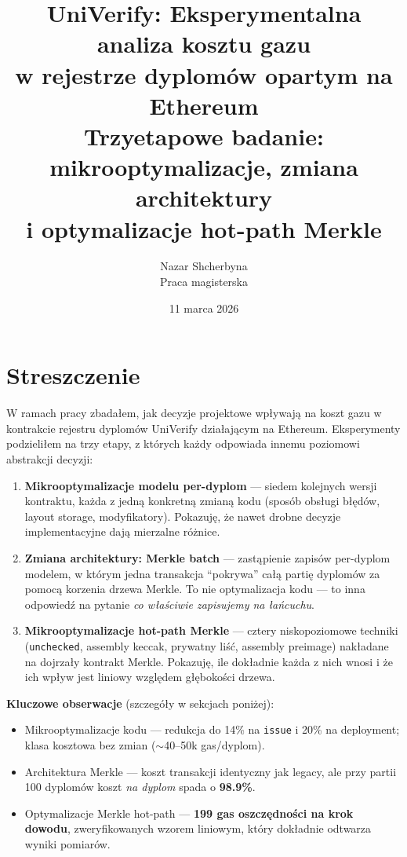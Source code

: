 \documentclass[11pt,a4paper]{article}
\title{\textbf{UniVerify: Eksperymentalna analiza kosztu gazu\\w rejestrze dyplomów opartym na Ethereum}\\[0.6em]
\large Trzyetapowe badanie: mikrooptymalizacje, zmiana architektury\\i optymalizacje hot-path Merkle}
\author{Nazar Shcherbyna \\ Praca magisterska}
\date{11 marca 2026}
\begin{document}
\maketitle
\tableofcontents
\newpage

\section{Streszczenie}

W ramach pracy zbadałem, jak decyzje projektowe wpływają na koszt gazu
w kontrakcie rejestru dyplomów UniVerify działającym na Ethereum.
Eksperymenty podzieliłem na trzy etapy, z których każdy odpowiada innemu
poziomowi abstrakcji decyzji:

\begin{enumerate}
  \item \textbf{Mikrooptymalizacje modelu per-dyplom} --- siedem kolejnych wersji
        kontraktu, każda z jedną konkretną zmianą kodu (sposób obsługi błędów,
        layout storage, modyfikatory). Pokazuję, że nawet drobne decyzje
        implementacyjne dają mierzalne różnice.

  \item \textbf{Zmiana architektury: Merkle batch} --- zastąpienie zapisów per-dyplom
        modelem, w którym jedna transakcja ``pokrywa'' całą partię dyplomów
        za pomocą korzenia drzewa Merkle. To nie optymalizacja kodu ---
        to inna odpowiedź na pytanie \emph{co właściwie zapisujemy na łańcuchu}.

  \item \textbf{Mikrooptymalizacje hot-path Merkle} --- cztery niskopoziomowe
        techniki (\texttt{unchecked}, assembly keccak, prywatny liść,
        assembly preimage) nakładane na dojrzały kontrakt Merkle. Pokazuję,
        ile dokładnie każda z nich wnosi i że ich wpływ jest liniowy
        względem głębokości drzewa.
\end{enumerate}

\noindent\textbf{Kluczowe obserwacje} (szczegóły w sekcjach poniżej):
\begin{itemize}
  \item Mikrooptymalizacje kodu --- redukcja do 14\% na \texttt{issue}
        i 20\% na deployment; klasa kosztowa bez zmian (\(\sim\)40--50k gas/dyplom).
  \item Architektura Merkle --- koszt transakcji identyczny jak legacy,
        ale przy partii 100 dyplomów koszt \emph{na dyplom} spada o \textbf{98.9\%}.
  \item Optymalizacje Merkle hot-path --- \textbf{199 gas oszczędności na krok dowodu},
        zweryfikowanych wzorem liniowym, który dokładnie odtwarza wyniki pomiarów.
\end{itemize}
\end{document}

